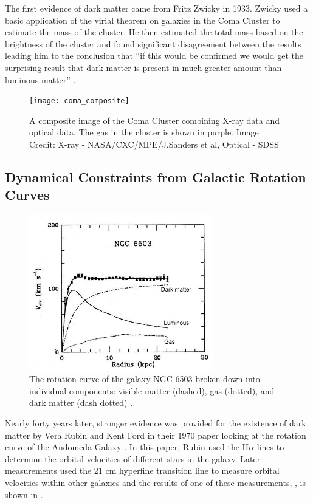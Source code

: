 The first evidence of dark matter came from Fritz Zwicky in 1933.  Zwicky used a basic application of the virial theorem on galaxies in the Coma Cluster	to estimate the mass of the cluster.  He then  estimated the total mass based on the brightness of the cluster and found significant disagreement between the results leading him to the conclusion that ``if this would be confirmed we would get the surprising result that dark matter is present in much greater amount than luminous matter'' \cite{Zwicky1933}.
	
\begin{figure}[h]
\texttt{[image: coma\_composite]}
\centering
\caption{A composite image of the Coma Cluster combining X-ray data and optical data.  The gas in the cluster is shown in purple.  Image Credit: X-ray - NASA/CXC/MPE/J.Sanders et al, Optical - SDSS}
\end{figure}
	
	
\subsection{Dynamical Constraints from Galactic Rotation Curves}	
	


\begin{figure}[b]
	\centering
	\includegraphics[width=8cm]{ngc_6503_rotation_curve}
	\caption{The rotation curve of the galaxy NGC 6503 broken down into individual components: visible matter (dashed), gas (dotted), and dark matter (dash dotted) \cite{Begeman1991}. }
	\label{fig:galactic_rotation_curve}
\end{figure}

	
Nearly forty years later, stronger evidence was provided for the existence of dark matter by Vera Rubin and Kent Ford in their 1970 paper looking at the rotation curve of the Andomeda Galaxy \cite{rubin1970rotation}.  In this paper, Rubin used the H$\alpha$ lines to determine the orbital velocities of different stars in the galaxy.  Later measurements used the 21 cm hyperfine transition line to measure orbital velocities within other galaxies and the results of one of these measurements, , is shown in .
	
